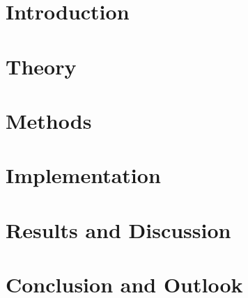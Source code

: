 \documentclass[12pt, twoside]{report}
\begin{document}

\cleardoublepage

\cleardoublepage


\setcounter{page}{1}


\begin{abstract}
    
\end{abstract}


\tableofcontents
\cleardoublepage


\listoffigures
\cleardoublepage


\setcounter{page}{1}


\chapter{Introduction}

\cleardoublepage


\chapter{Theory}

\cleardoublepage


\chapter{Methods}

\cleardoublepage


\chapter{Implementation}

\cleardoublepage


\chapter{Results and Discussion}

\cleardoublepage


\chapter{Conclusion and Outlook}

\cleardoublepage


\appendix
% 
\end{document}
